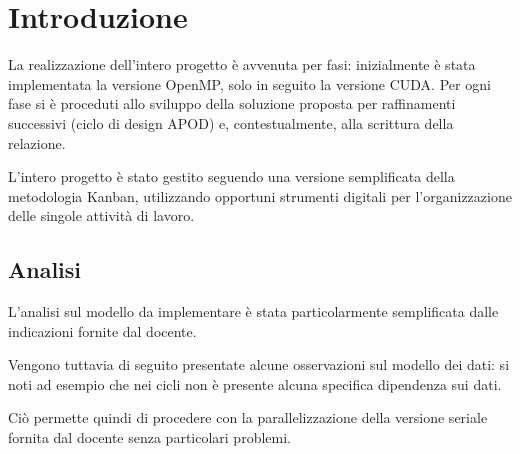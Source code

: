 \section{Introduzione}

La realizzazione dell'intero progetto è avvenuta per fasi: inizialmente è stata
implementata la versione OpenMP, solo in seguito la versione CUDA.  Per ogni
fase si è proceduti allo sviluppo della soluzione proposta per raffinamenti
successivi (ciclo di design APOD\cite{nvidiaapod}) e, contestualmente, alla
scrittura della relazione.

L'intero progetto è stato gestito seguendo una versione semplificata della
metodologia Kanban\cite{wiki:kanbandev}, utilizzando opportuni strumenti
digitali per l'organizzazione delle singole attività di lavoro.

\subsection{Analisi}
L'analisi sul modello da implementare è stata particolarmente semplificata dalle
indicazioni fornite dal docente.

Vengono tuttavia di seguito presentate alcune osservazioni sul modello dei dati:
si noti ad esempio che nei cicli non è presente alcuna specifica dipendenza
sui dati.

Ciò permette quindi di procedere con la parallelizzazione della versione seriale
fornita dal docente senza particolari problemi.
